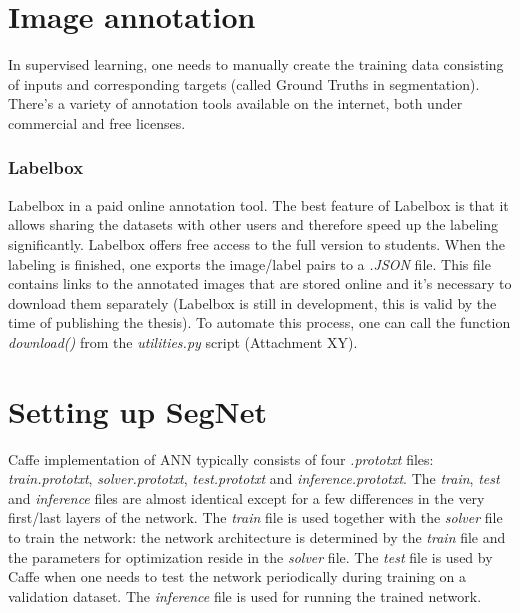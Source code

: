 \newpage
\section{Image annotation}

In supervised learning, one needs to manually create the training data consisting of inputs and corresponding targets (called Ground Truths in segmentation). There's a variety of annotation tools available on the internet, both under commercial and free licenses. 

\subsubsection{Labelbox}

Labelbox in a paid online annotation tool. The best feature of Labelbox \cite{labelbox} is that it allows sharing the datasets with other users and therefore speed up the labeling significantly. Labelbox offers free access to the full version to students. When the labeling is finished, one exports the image/label pairs to a \textit{.JSON} file. This file contains links to the annotated images that are stored online and it's necessary to download them separately (Labelbox is still in development, this is valid by the time of publishing the thesis). To automate this process, one can call the function \textit{download()} from the \textit{utilities.py} script (Attachment XY). 



\section{Setting up SegNet}

Caffe implementation of ANN typically consists of four \textit{.prototxt} files: \textit{train.prototxt}, \textit{solver.prototxt}, \textit{test.prototxt} and \textit{inference.prototxt}. The \textit{train}, \textit{test} and \textit{inference} files are almost identical except for a few differences in the very first/last layers of the network. The \textit{train} file is used together with the \textit{solver} file to train the network: the network architecture is determined by the \textit{train} file and the parameters for optimization reside in the \textit{solver} file. The \textit{test} file is used by Caffe when one needs to test the network periodically during training on a validation dataset. The \textit{inference} file is used for running the trained network.

